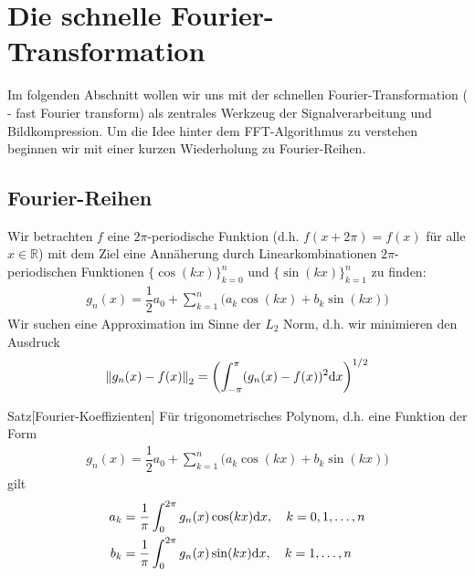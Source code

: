 
\section{Die schnelle Fourier-Transformation}

Im folgenden Abschnitt wollen wir uns mit der schnellen Fourier-Transformation ( - fast Fourier transform) 
als zentrales Werkzeug der Signalverarbeitung und Bildkompression. 
Um die Idee hinter dem FFT-Algorithmus zu verstehen beginnen wir mit einer kurzen Wiederholung zu Fourier-Reihen.

\subsection{Fourier-Reihen}
Wir betrachten $f$ eine $2\pi$-periodische Funktion (d.h. $f(x+2\pi)=f(x)$ für alle $x\in\mathbb{R}$) mit 
dem Ziel eine Annäherung durch Linearkombinationen $2\pi$-periodischen Funktionen $\{\cos(kx)\}_{k=0}^{n}$ und 
$\{\sin(kx)\}_{k=1}^{n}$ zu finden:
\begin{align*}
  g_n(x) = \dfrac{1}{2}a_0 + \sum_{k=1}^{n}\Big(a_k\cos(kx)+b_k\sin(kx)\Big)
\end{align*}
Wir suchen eine Approximation im Sinne der $L_2$ Norm, d.h. wir minimieren den Ausdruck
\begin{align*}
  \vertn{2}{g_n(x)-f(x)}_2 = \left(\int_{-\pi}^{\pi} (g_n(x)-f(x))^2 \diff x\right)^{1/2}
\end{align*}

\begin{colbox}{Satz}[Fourier-Koeffizienten]
  Für trigonometrisches Polynom, d.h. eine Funktion der Form  
  \begin{align*}
    g_n(x) = \dfrac{1}{2}a_0 + \sum_{k=1}^{n}\Big(a_k\cos(kx)+b_k\sin(kx)\Big)
  \end{align*}
  gilt 
  \begin{align*}
    a_k 
    &= \dfrac{1}{\pi} \int_{0}^{2\pi} g_n(x)\cos(kx) \text{d} x, \quad k=0,1,\dots,n \\
    b_k 
    &= \dfrac{1}{\pi} \int_{0}^{2\pi} g_n(x)\sin(kx) \text{d} x, \quad k=1,\dots,n 
  \end{align*}
\end{colbox}


